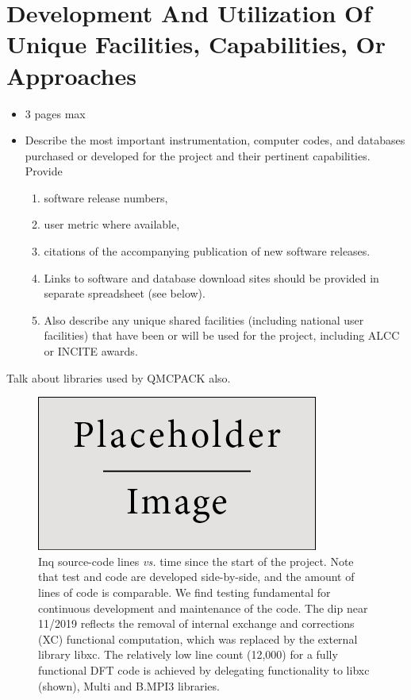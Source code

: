 \section{Development And Utilization Of Unique Facilities, Capabilities, Or Approaches}
\label{sec:development}
{\small\color{red}
\begin{itemize}
\item 3 pages max
    \item Describe the most important instrumentation, computer codes, and databases purchased or developed for the project and their pertinent capabilities. Provide 
    \begin{enumerate}
        \item software release numbers,
        \item user metric where available,
        
        \item citations of the accompanying publication of new software releases.
        \item Links to software and database download sites should be provided in separate spreadsheet (see below).
        \item Also describe any unique shared facilities (including national user facilities) that have been or will be used for the project, including ALCC or INCITE awards.
    \end{enumerate}    
\end{itemize}

}

Talk about libraries used by QMCPACK also.

\begin{figure}
    \centering
    \includegraphics{figures/placeholder.jpg}%
    \caption{
        Inq source-code lines \emph{vs.} time since the start of the project.  
        Note that test and code are developed side-by-side, and the amount of lines of code is comparable.  We     find testing fundamental for continuous development and maintenance of the code. 
        The dip near 11/2019 reflects the removal of internal exchange and corrections (XC) functional computation, which was replaced by the external library libxc. 
        The relatively low line count (12,000) for a fully functional DFT code is achieved by delegating functionality to libxc (shown), Multi and B.MPI3 libraries.}
    \label{fig:lines_overlay}
\end{figure}

\clearpage